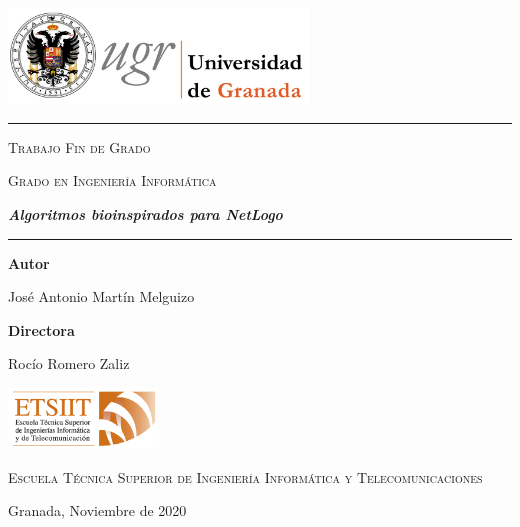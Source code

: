 \documentclass[a4paper,12pt]{report}
\begin{document}
    \begin{titlepage}
        \centering
        {\includegraphics[width=0.6\textwidth]{images/ugr.jpeg}\par}    
        \vspace{1.5cm}
        \hrule height 0.5pt
        \vspace{1cm}
        {\scshape\LARGE Trabajo Fin de Grado \par}
        \vspace{0.2cm}
        {\scshape\large Grado en Ingeniería Informática \par}
        \vspace{1cm}
        {\itshape\Large \textbf{Algoritmos bioinspirados para NetLogo}\par}
        \vspace{1cm}
        \hrule height 1.5pt
        \vspace{1cm}
        {\normalsize \textbf{Autor}\par}
        \vspace{0.1cm}
        {\normalsize José Antonio Martín Melguizo\par}
        \vspace{1.5cm}
        {\normalsize \textbf{Directora}\par}
        \vspace{0.1cm}
        {\normalsize Rocío Romero Zaliz\par}
		\vspace{3cm}
		{\includegraphics[width=0.3\textwidth]{images/etsiit.png}\par}
		\vspace{0.5cm}
		{\scshape\large Escuela Técnica Superior de Ingeniería Informática y Telecomunicaciones \par}
		\vspace{0.5cm}
        \large{Granada, Noviembre de 2020}
        \vfill
        
    \end{titlepage}

\clearpage
\end{document}
